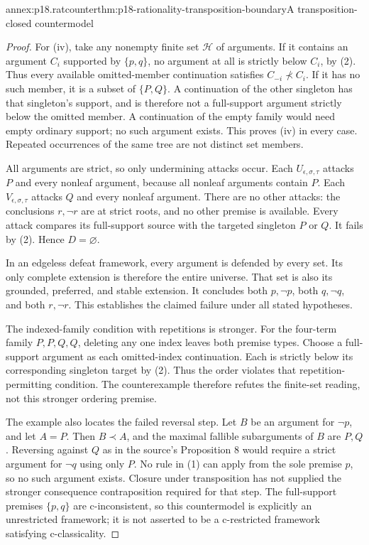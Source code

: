 \begin{annexitem}{annex:p18.ratcounter}{thm:p18-rationality-transposition-boundary}{A transposition-closed countermodel}
\begin{proof}
For (iv), take any nonempty finite set \(\mathcal H\) of arguments.
If it contains an argument \(C_i\) supported by \(\{p,q\}\), no argument
at all is strictly below \(C_i\), by (2). Thus every available omitted-member
continuation satisfies \(C_{-i}\not\prec C_i\).
If it has no such member, it is a subset of \(\{P,Q\}\).
A continuation of the other singleton has that singleton's support,
and is therefore not a full-support argument strictly below the omitted
member. A continuation of the empty family would need empty ordinary
support; no such argument exists. This proves (iv) in every case.
Repeated occurrences of the same tree are not distinct set members.

All arguments are strict, so only undermining attacks occur.
Each \(U_{\epsilon,\sigma,\tau}\) attacks \(P\) and every nonleaf
argument, because all nonleaf arguments contain \(P\).
Each \(V_{\epsilon,\sigma,\tau}\) attacks \(Q\) and every nonleaf
argument. There are no other attacks: the conclusions \(r,\neg r\)
are at strict roots, and no other premise is available.
Every attack compares its full-support source with the targeted
singleton \(P\) or \(Q\). It fails by (2). Hence \(D=\varnothing\).

In an edgeless defeat framework, every argument is defended by every set.
Its only complete extension is therefore the entire universe. That set
is also its grounded, preferred, and stable extension.
It concludes both \(p,\neg p\), both \(q,\neg q\), and both \(r,\neg r\).
This establishes the claimed failure under all stated hypotheses.

The indexed-family condition with repetitions is stronger. For the
four-term family \(P,P,Q,Q\), deleting any one index leaves both
premise types. Choose a full-support argument as each omitted-index
continuation. Each is strictly below its corresponding singleton target
by (2). Thus the order violates that repetition-permitting condition.
The counterexample therefore refutes the finite-set reading, not this
stronger ordering premise.

The example also locates the failed reversal step. Let \(B\) be an
argument for \(\neg p\), and let \(A=P\). Then \(B\prec A\), and
the maximal fallible subarguments of \(B\) are \(P,Q\).
Reversing against \(Q\) as in the source's Proposition 8 would require
a strict argument for \(\neg q\) using only \(P\). No rule in (1)
can apply from the sole premise \(p\), so no such argument exists.
Closure under transposition has not supplied the stronger consequence
contraposition required for that step.
The full-support premises \(\{p,q\}\) are c-inconsistent, so this
countermodel is explicitly an unrestricted framework; it is not asserted
to be a c-restricted framework satisfying c-classicality.
\end{proof}
\end{annexitem}

